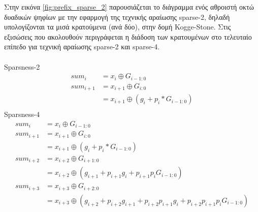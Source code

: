 Στην εικόνα \ref{fig:prefix_sparse_2} παρουσιάζεται το διάγραμμα ενός αθροιστή οκτώ δυαδικών ψηφίων με την εφαρμογή της τεχνικής αραίωσης sparse-2, δηλαδή υπολογίζονται τα μισά κρατούμενα (ανά δύο), στην δομή Kogge-Stone. Στις εξισώσεις που ακολουθούν περιγράφεται η διάδοση των κρατουμένων στο τελευταίο επίπεδο για τεχνική αραίωσης sparse-2 και sparse-4.\\\\
Sparsness-2
\begin{equation*}
    \begin{split}
        sum_i &= x_i \oplus G_{i-1:0}\\
        sum_{i+1} &= x_{i+1} \oplus G_{i:0}\\
        &= x_{i+1} \oplus (g_i + p_i*G_{i-1:0})\\
    \end{split} 
\end{equation*}
Sparsness-4
\begin{equation*}
    \begin{split}
        sum_i &= x_i \oplus G_{i-1:0}\\
        sum_{i+1} &= x_{i+1} \oplus G_{i:0}\\
        &= x_{i+1} \oplus (g_i + p_i*G_{i-1:0})\\
        sum_{i+2} &= x_{i+2} \oplus G_{i+1:0}\\
        &= x_{i+2} \oplus (g_{i+1} + p_{i+1}g_i + p_{i+1}p_iG_{i-1:0})\\
        sum_{i+3} &= x_{i+3} \oplus G_{i+2:0}\\
        &= x_{i+3} \oplus (g_{i+2} + p_{i+2}g_{i+1} + p_{i+2}p_{i+1}g_i + p_{i+2}p_{i+1}p_iG_{i-1:0})\\
    \end{split} 
\end{equation*}


















